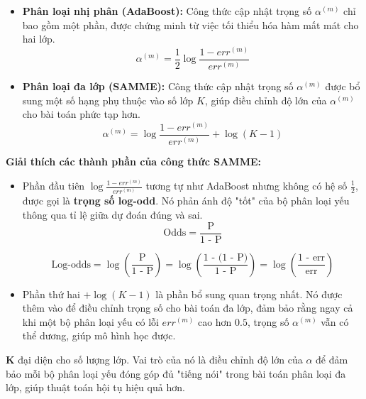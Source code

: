 \documentclass[11pt]{article}
\begin{document}
\begin{itemize}
    \item \textbf{Phân loại nhị phân (AdaBoost):}
    Công thức cập nhật trọng số $\alpha^{(m)}$ chỉ bao gồm một phần, được chứng minh từ việc tối thiểu hóa hàm mất mát cho hai lớp.
    \[
    \alpha^{(m)} = \frac{1}{2} \log \frac{1 - err^{(m)}}{err^{(m)}}
    \]

    \item \textbf{Phân loại đa lớp (SAMME):}
    Công thức cập nhật trọng số $\alpha^{(m)}$ được bổ sung một số hạng phụ thuộc vào số lớp $K$, giúp điều chỉnh độ lớn của $\alpha^{(m)}$ cho bài toán phức tạp hơn.
    \[
    \alpha^{(m)} = \log \frac{1 - err^{(m)}}{err^{(m)}} + \log(K - 1)
    \]
\end{itemize}

\noindent \textbf{Giải thích các thành phần của công thức SAMME:}
\begin{itemize}
    \item Phần đầu tiên $\log\frac{1 - err^{(m)}}{err^{(m)}}$ tương tự như AdaBoost nhưng không có hệ số $\frac{1}{2}$, được gọi là \textbf{trọng số log-odd}. Nó phản ánh độ "tốt" của bộ phân loại yếu thông qua tỉ lệ giữa dự đoán đúng và sai.
\[
\text{Odds} = \frac{\text{P}}{\text{1 - P}}
\]

\[
\text{Log-odds} = \log\left(\frac{\text{P}}{\text{1 - P}}\right) 
= \log\left(\frac{\text{1 - (1 - P)}}{\text{1 - P}}\right) 
= \log\left(\frac{\text{1 - err}}{\text{err}}\right)
\]


    \item Phần thứ hai $+\log(K - 1)$ là phần bổ sung quan trọng nhất. Nó được thêm vào để điều chỉnh trọng số cho bài toán đa lớp, đảm bảo rằng ngay cả khi một bộ phân loại yếu có lỗi $err^{(m)}$ cao hơn $0.5$, trọng số $\alpha^{(m)}$ vẫn có thể dương, giúp mô hình học được.
\end{itemize}

\noindent \textbf{K} đại diện cho số lượng lớp. Vai trò của nó là điều chỉnh độ lớn của $\alpha$ để đảm bảo mỗi bộ phân loại yếu đóng góp đủ "tiếng nói" trong bài toán phân loại đa lớp, giúp thuật toán hội tụ hiệu quả hơn.

\printbibliography
\end{document}

